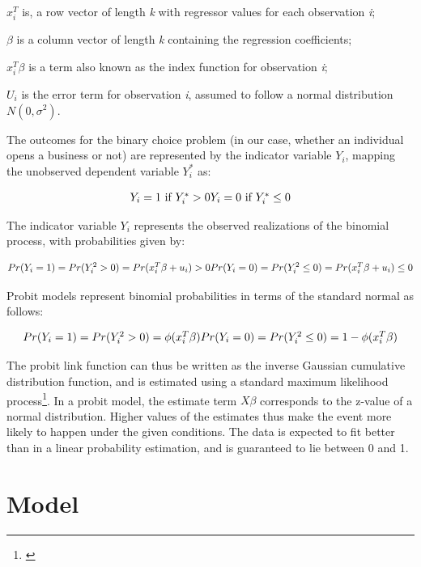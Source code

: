 $x^T_i$ is, a row vector of length \textit{k} with regressor values for each observation \textit{i};

$\beta$ is a column vector of length \textit{k} containing the regression coefficients;

$x^T_i\beta$ is a term also known as the index function for observation \textit{i};

$U_i$ is the error term for observation \textit{i}, assumed to follow a normal distribution $N(0, \sigma^2)$. 


The outcomes for the binary choice problem (in our case, whether an individual opens a business or not) are represented by the indicator variable $Y_i$, mapping the unobserved dependent variable $Y^*_i$ as:

\begin{dmath}
\mbox{$Y_i = 1 \mbox{ if } Y^{*}_{i}>0$} \\
\mbox{$Y_i = 0 \mbox{ if } Y^*_i\leq 0$}
\end{dmath}

The indicator variable $Y_i$ represents the observed realizations of the binomial process, with probabilities given by:

\begin{dmath}
\mbox{$Pr(Y_i = 1) = Pr(Y^2_i > 0) = Pr (x^T_i\beta + u_i) >0 $} \\
\mbox{$Pr(Y_i = 0) = Pr(Y^2_i \leq 0) = Pr (x^T_i\beta + u_i) \leq 0 $}
\end{dmath}

Probit models represent binomial probabilities in terms of the standard normal as follows:

\begin{dmath}
\mbox{$Pr(Y_i = 1) = Pr(Y^2_i > 0) = \phi(x^T_i\beta) $} \\
\mbox{$Pr(Y_i = 0) = Pr(Y^2_i \leq 0) = 1 - \phi(x^T_i\beta) $}
\end{dmath}

The probit link function can thus be written as the inverse Gaussian cumulative distribution function, and is estimated using a standard maximum likelihood process\footnote{\cite{AldrichNelson1984}}. In a probit model, the estimate term $X\beta$ corresponds to the z-value of a normal distribution. Higher values of the estimates thus make the event more likely to happen under the given conditions. The data is expected to fit better than in a linear probability estimation, and is guaranteed to lie between 0 and 1. 

\section{Model}

